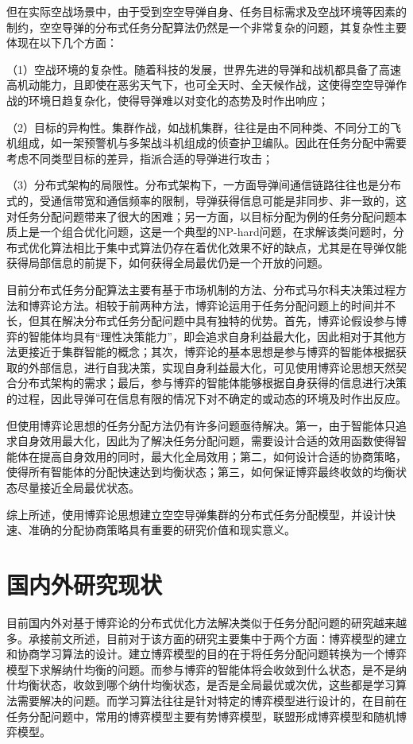 但在实际空战场景中，由于受到空空导弹自身、任务目标需求及空战环境等因素的制约，空空导弹的分布式任务分配算法仍然是一个非常复杂的问题，其复杂性主要体现在以下几个方面：

（1）空战环境的复杂性。随着科技的发展，世界先进的导弹和战机都具备了高速高机动能力，且即使在恶劣天气下，也可全天时、全天候作战，这使得空空导弹作战的环境日趋复杂化，使得导弹难以对变化的态势及时作出响应；

（2）目标的异构性。集群作战，如战机集群，往往是由不同种类、不同分工的飞机组成，如一架预警机与多架战斗机组成的侦查护卫编队。因此在任务分配中需要考虑不同类型目标的差异，指派合适的导弹进行攻击；

（3）分布式架构的局限性。分布式架构下，一方面导弹间通信链路往往也是分布式的，受通信带宽和通信频率的限制，导弹获得信息可能是非同步、非一致的，这对任务分配问题带来了很大的困难；另一方面，以目标分配为例的任务分配问题本质上是一个组合优化问题，这是一个典型的NP-hard问题，在求解该类问题时，分布式优化算法相比于集中式算法仍存在着优化效果不好的缺点，尤其是在导弹仅能获得局部信息的前提下，如何获得全局最优仍是一个开放的问题。

目前分布式任务分配算法主要有基于市场机制的方法、分布式马尔科夫决策过程方法和博弈论方法。相较于前两种方法，博弈论运用于任务分配问题上的时间并不长，但其在解决分布式任务分配问题中具有独特的优势。首先，博弈论假设参与博弈的智能体均具有“理性决策能力”，即会追求自身利益最大化，因此相对于其他方法更接近于集群智能的概念；其次，博弈论的基本思想是参与博弈的智能体根据获取的外部信息，进行自我决策，实现自身利益最大化，可见使用博弈论思想天然契合分布式架构的需求；最后，参与博弈的智能体能够根据自身获得的信息进行决策的过程，因此导弹可在信息有限的情况下对不确定的或动态的环境及时作出反应。

但使用博弈论思想的任务分配方法仍有许多问题亟待解决。第一，由于智能体只追求自身效用最大化，因此为了解决任务分配问题，需要设计合适的效用函数使得智能体在提高自身效用的同时，最大化全局效用；第二，如何设计合适的协商策略，使得所有智能体的分配快速达到均衡状态；第三，如何保证博弈最终收敛的均衡状态尽量接近全局最优状态。

综上所述，使用博弈论思想建立空空导弹集群的分布式任务分配模型，并设计快速、准确的分配协商策略具有重要的研究价值和现实意义。


\section{国内外研究现状}
\label{intro:sec:related}

目前国内外对基于博弈论的分布式优化方法解决类似于任务分配问题的研究越来越多。承接前文所述，目前对于该方面的研究主要集中于两个方面：博弈模型的建立和协商学习算法的设计。建立博弈模型的目的在于将任务分配问题转换为一个博弈模型下求解纳什均衡的问题。而参与博弈的智能体将会收敛到什么状态，是不是纳什均衡状态，收敛到哪个纳什均衡状态，是否是全局最优或次优，这些都是学习算法需要解决的问题。而学习算法往往是针对特定的博弈模型进行设计的，在目前在任务分配问题中，常用的博弈模型主要有势博弈模型，联盟形成博弈模型和随机博弈模型。

